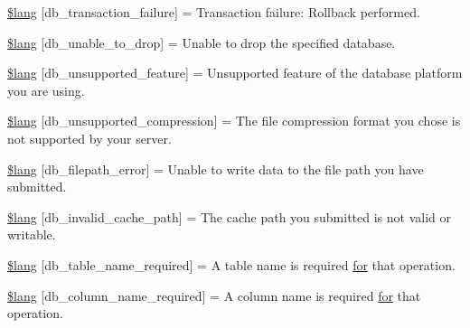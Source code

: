 \begin{DoxyCompactItemize}
\item 
\hyperlink{_admin_2system_2language_2english_2db__lang_8php_a35f225a7ead01f13f8c6423b7c7433a0}{\$lang} \mbox{[}\textquotesingle{}db\+\_\+transaction\+\_\+failure\textquotesingle{}\mbox{]} = \textquotesingle{}Transaction failure\+: Rollback performed.\textquotesingle{}
\item 
\hyperlink{_admin_2system_2language_2english_2db__lang_8php_af391f0d50d64cbb95cd733fa947fdb5e}{\$lang} \mbox{[}\textquotesingle{}db\+\_\+unable\+\_\+to\+\_\+drop\textquotesingle{}\mbox{]} = \textquotesingle{}Unable to drop the specified database.\textquotesingle{}
\item 
\hyperlink{_admin_2system_2language_2english_2db__lang_8php_ac9a47dcf094e785346ea1834e63df941}{\$lang} \mbox{[}\textquotesingle{}db\+\_\+unsupported\+\_\+feature\textquotesingle{}\mbox{]} = \textquotesingle{}Unsupported feature of the database platform you are using.\textquotesingle{}
\item 
\hyperlink{_admin_2system_2language_2english_2db__lang_8php_ae745d23d59478f529442768816df6f36}{\$lang} \mbox{[}\textquotesingle{}db\+\_\+unsupported\+\_\+compression\textquotesingle{}\mbox{]} = \textquotesingle{}The file compression format you chose is not supported by your server.\textquotesingle{}
\item 
\hyperlink{_admin_2system_2language_2english_2db__lang_8php_a0519c50a806cec99f29b499aec2582e5}{\$lang} \mbox{[}\textquotesingle{}db\+\_\+filepath\+\_\+error\textquotesingle{}\mbox{]} = \textquotesingle{}Unable to write data to the file path you have submitted.\textquotesingle{}
\item 
\hyperlink{_admin_2system_2language_2english_2db__lang_8php_a67157df2896b342e247ab744adf2b9e5}{\$lang} \mbox{[}\textquotesingle{}db\+\_\+invalid\+\_\+cache\+\_\+path\textquotesingle{}\mbox{]} = \textquotesingle{}The cache path you submitted is not valid or writable.\textquotesingle{}
\item 
\hyperlink{_admin_2system_2language_2english_2db__lang_8php_a2899cf8f7246d7fa97660ea52856ade5}{\$lang} \mbox{[}\textquotesingle{}db\+\_\+table\+\_\+name\+\_\+required\textquotesingle{}\mbox{]} = \textquotesingle{}A table name is required \hyperlink{confirm__transfer_8php_aaf007b9fa5c90d7c5a7011bece9cfc15}{for} that operation.\textquotesingle{}
\item 
\hyperlink{_admin_2system_2language_2english_2db__lang_8php_ac87ab86a1f105d87327480b6d0659b13}{\$lang} \mbox{[}\textquotesingle{}db\+\_\+column\+\_\+name\+\_\+required\textquotesingle{}\mbox{]} = \textquotesingle{}A column name is required \hyperlink{confirm__transfer_8php_aaf007b9fa5c90d7c5a7011bece9cfc15}{for} that operation.\textquotesingle{}

\end{DoxyCompactItemize}
